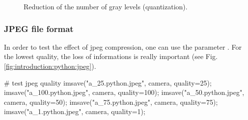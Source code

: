 \begin{figure}[H]
 \centering\caption{Reduction of the number of gray levels (quantization).}
 \hfill
 \hfill
 \label{fig:introduction:python:quantization}%

\end{figure}


\subsubsection{JPEG file format}
In order to test the effect of jpeg compression, one can use the parameter . For the lowest quality, the loss of informations is really important (see Fig.\ref{fig:introduction:python:jpeg}).
\begin{python}
# test jpeg quality
imsave("a_25.python.jpeg", camera, quality=25);
imsave("a_100.python.jpeg", camera, quality=100);
imsave("a_50.python.jpeg", camera, quality=50);
imsave("a_75.python.jpeg", camera, quality=75);
imsave("a_1.python.jpeg", camera, quality=1);
\end{python}
 
